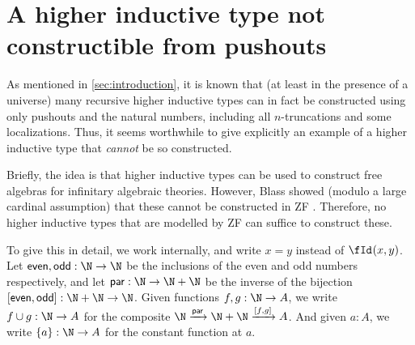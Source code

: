 \section{A higher inductive type not constructible from pushouts}
\label{sec:blass}

As mentioned in \cref{sec:introduction}, it is known that (at least in the presence of a universe) many recursive higher inductive types can in fact be constructed using only pushouts and the natural numbers, including all $n$-truncations and some localizations.
Thus, it seems worthwhile to give explicitly an example of a higher inductive type that \emph{cannot} be so constructed.

Briefly, the idea is that higher inductive types can be used to construct free algebras for infinitary algebraic theories.
However, Blass showed (modulo a large cardinal assumption) that these cannot be constructed in ZF \cite{blass:freealg}.
Therefore, no higher inductive types that are modelled by ZF can suffice to construct these.

To give this in detail, we work internally, and write $x=y$ instead of $\id x y$.
Let $\mathsf{even},\mathsf{odd}:\N\to\N$ be the inclusions of the even and odd numbers respectively, and let $\mathsf{par}:\N\to\N+\N$ be the inverse of the bijection $[\mathsf{even},\mathsf{odd}]:\N+\N\to\N$.
Given functions $f,g:\N\to A$, we write $f\cup g:\N\to A$ for the composite $\N \xto{\mathsf{par}} \N+\N \xto{[f,g]}A$.
And given $a:A$, we write $\{a\}:\N\to A$ for the constant function at $a$.

